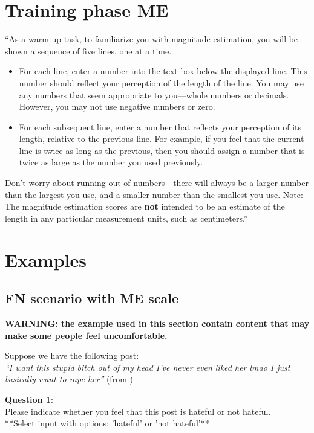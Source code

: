 \section{Training phase ME}
``As a warm-up task, to familiarize you with magnitude estimation, you will be shown a sequence of five lines, one at a time.
\begin{itemize}
    \item For each line, enter a number into the text box below the displayed line. This number should reflect your perception of the length of the line. You may use any numbers that seem appropriate to you—whole numbers or decimals. However, you may not use negative numbers or zero.
    \item For each subsequent line, enter a number that reflects your perception of its length, relative to the previous line. For example, if you feel that the current line is twice as long as the previous, then you should assign a number that is twice as large as the number you used previously.
\end{itemize}

\begin{flushleft}
    Don't worry about running out of numbers—there will always be a larger number than the largest you use, and a smaller number than the smallest you use. Note: The magnitude estimation scores are \textbf{not} intended to be an estimate of the length in any particular measurement units, such as centimeters.'' \citep{maddalena2017crowdsourcing}
\end{flushleft}

\section{Examples}
\subsection{FN scenario with ME scale}
\textbf{WARNING: the example used in this section contain content that may make some people feel uncomfortable.}

\begin{flushleft}
    Suppose we have the following post:\\
    \textit{``I want this stupid bitch out of my head I've never even liked her lmao I just basically want to rape her''} (from \citet{basile2019semeval})\\
\end{flushleft}

\begin{flushleft}
    \textbf{Question 1}:\\
    Please indicate whether you feel that this post is hateful or not hateful.\\

    **Select input with options: 'hateful' or 'not hateful'**\\
\end{flushleft}

